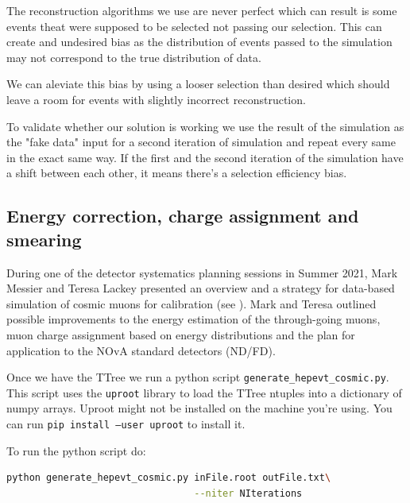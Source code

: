 \documentclass[12pt]{article}
\begin{document}
The reconstruction algorithms we use are never perfect which can result is some events theat were supposed to be selected not passing our selection. This can create and undesired bias as the distribution of events passed to the simulation may not correspond to the true distribution of data.

We can aleviate this bias by using a looser selection than desired which should leave a room for events with slightly incorrect reconstruction.

To validate whether our solution is working we use the result of the simulation as the "fake data" input for a second iteration of simulation and repeat every same in the exact same way. If the first and the second iteration of the simulation have a shift between each other, it means there's a selection efficiency bias.

\subsection{Energy correction, charge assignment and smearing}\label{secPython}
During one of the detector systematics planning sessions in Summer 2021, Mark Messier and Teresa Lackey presented an overview and a strategy for data-based simulation of cosmic muons for calibration (see \cite{NOVA-doc-51327-v3}). Mark and Teresa outlined possible improvements to the energy estimation of the through-going muons, muon charge assignment based on energy distributions and the plan for application to the NOvA standard detectors (ND/FD).

Once we have the TTree we run a python script \texttt{generate\_hepevt\_cosmic.py}. This script uses the \texttt{uproot} library to load the TTree ntuples into a dictionary of numpy arrays. Uproot might not be installed on the machine you're using. You can run \texttt{pip install --user uproot} to install it.

To run the python script do:
\begin{lstlisting}[frame=single,language=bash]
python generate_hepevt_cosmic.py inFile.root outFile.txt\
                                 --niter NIterations
\end{lstlisting}
\end{document}
